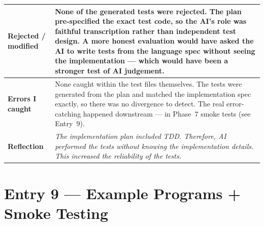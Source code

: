 \documentclass[a4paper,10pt]{article}
\begin{document}
\begin{tabular}{|
    >{\bfseries}m{3.5cm}|
    m{10cm}|
}
\hline
\rowcolor{white}
Rejected / modified & None of the generated tests were rejected. The plan pre-specified the exact test code, so the AI's role was faithful transcription rather than independent test design. A more honest evaluation would have asked the AI to write tests from the language spec without seeing the implementation --- which would have been a stronger test of AI judgement. \\
\hline
\rowcolor{altrow}
Errors I caught   & None caught within the test files themselves. The tests were generated from the plan and matched the implementation spec exactly, so there was no divergence to detect. The real error-catching happened downstream --- in Phase~7 smoke tests (see Entry~9). \\
\hline
\rowcolor{white}
Reflection & \textit{The implementation plan included TDD. Therefore, AI performed the tests without knowing the implementation details. This increased the reliability of the tests.} \\
\hline
\end{tabular}

\newpage

\section{Entry 9 --- Example Programs + Smoke Testing}
\end{document}
